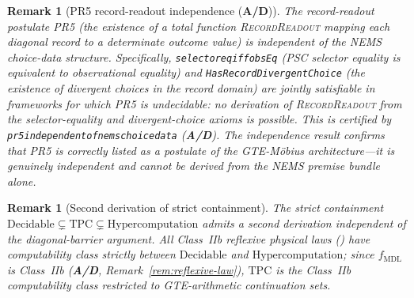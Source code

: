 \documentclass[12pt,letterpaper]{article}
\newtheorem{remark}[theorem]{Remark}
\newcommand{\fmdl}{f_{\mathrm{MDL}}}
\newcommand{\TPC}{\mathrm{TPC}}
\newcommand{\catAD}{\textbf{A/D}}
\newcommand{\lean}[1]{%
  \penalty-100
  \begingroup\def\_{\textunderscore\allowbreak}\texttt{#1}\endgroup}
\begin{document}
\begin{remark}[PR5 record-readout independence (\catAD)]
\label{rem:pr5-independence}
The record-readout postulate PR5 (the existence of a total function
\textsc{RecordReadout} mapping each diagonal record to a determinate
outcome value) is \emph{independent} of the NEMS choice-data structure.
Specifically, \lean{selector\_eq\_iff\_obsEq} (PSC selector equality is
equivalent to observational equality) and \lean{HasRecordDivergentChoice}
(the existence of divergent choices in the record domain) are jointly
satisfiable in frameworks for which PR5 is undecidable: no derivation of
\textsc{RecordReadout} from the selector-equality and divergent-choice
axioms is possible.  This is certified by \lean{pr5\_independent\_of\_nems\_choice\_data}
(\catAD).  The independence result confirms that PR5 is correctly listed as
a postulate of the GTE-M\"{o}bius architecture---it is genuinely independent
and cannot be derived from the NEMS premise bundle alone.
\end{remark}

\begin{remark}[Second derivation of strict containment]
\label{rem:tpc-second-derivation}
The strict containment $\mathrm{Decidable} \subsetneq \TPC \subsetneq
\mathrm{Hypercomputation}$ admits a second derivation independent of the
diagonal-barrier argument.  All Class~IIb reflexive physical laws
(\cite{SpivackReflexiveLaw,SpivackNEMS10}) have
computability class strictly between $\mathrm{Decidable}$ and
$\mathrm{Hypercomputation}$; since $\fmdl$ is Class~IIb (\catAD,
Remark~\ref{rem:reflexive-law}), $\TPC$ is the Class~IIb computability
class restricted to GTE-arithmetic continuation sets.
\end{remark}
\end{document}

